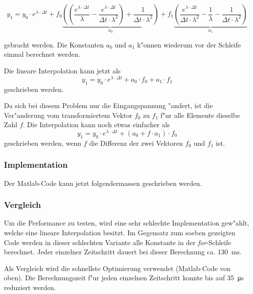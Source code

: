 \begin{refsection}
\begin{equation*}
	y_1 = y_0 \cdot e^{\lambda \cdot \Delta t} + f_0 \underbrace{\left(\left(\frac{e^{\lambda \cdot \Delta t}}{\lambda} - \frac{e^{\lambda \cdot \Delta t}}{\Delta t \cdot \lambda ^2}\right) + \frac{1}{\Delta t \cdot \lambda^2}\right)}_{a_0} + f_1 \underbrace{\left(\frac{e^{\lambda \cdot \Delta t}}{\Delta t \cdot \lambda^2} - \frac{1}{\lambda} - \frac{1}{\Delta t \cdot \lambda^2}\right)}_{a_1}
\end{equation*} 

gebracht werden. Die Konstanten $a_0$ und $a_1$ k"onnen wiederum vor der Schleife einmal berechnet werden. 

Die lineare Interpolation kann jetzt als 
\begin{equation*}
	y_1 = y_0 \cdot e^{\lambda \cdot \Delta t} + a_0 \cdot f_0 + a_1 \cdot f_1
\end{equation*}
geschrieben werden. 

Da sich bei diesem Problem nur die Eingangspannung "andert, ist die Ver"anderung vom transformiertem Vektor $f_0$ zu $f_1$ f"ur alle Elemente dieselbe Zahl $f$. Die Interpolation kann noch etwas einfacher als
\begin{equation*}
	y_1 = y_0 \cdot e^{\lambda \cdot \Delta t} + (a_0 + f \cdot  a_1) \cdot f_0
\end{equation*}
geschrieben werden, wenn $f$ die Differenz der zwei Vektoren $f_0$ und $f_1$ ist. 

\subsubsection{Implementation}
Der Matlab-Code kann jetzt folgendermassen geschrieben werden.

{\scriptsize }


\subsubsection{Vergleich}

Um die Performance zu testen, wird eine sehr schlechte Implementation gew"ahlt, welche eine lineare Interpolation besitzt. Im Gegensatz zum soeben gezeigten Code werden in dieser schlechten Variante alle Konstante in der \textit{for}-Schleife berechnet. Jeder einzelner Zeitschritt dauert bei dieser Berechnung ca. \SI{130}{\milli\second}. 

Als Vergleich wird die schnellste Optimierung verwendet (Matlab-Code von oben). Die Berechnungszeit f"ur jeden einzelnen Zeitschritt konnte bis auf \SI{35}{\micro \second} reduziert werden. 


\end{refsection}
